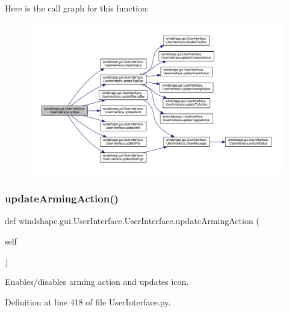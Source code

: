 Here is the call graph for this function\+:\nopagebreak
\begin{figure}[H]
\begin{center}
\leavevmode
\includegraphics[width=350pt]{classwindshape_1_1gui_1_1_user_interface_1_1_user_interface_a65ae15262d2becb2093acd7e54b92fb3_cgraph}
\end{center}
\end{figure}
\mbox{\label{classwindshape_1_1gui_1_1_user_interface_1_1_user_interface_a6eea698663fbc82963d3984b0a9a8ef1}} 
\subsubsection{\texorpdfstring{update\+Arming\+Action()}{updateArmingAction()}}
{\footnotesize\ttfamily def windshape.\+gui.\+User\+Interface.\+User\+Interface.\+update\+Arming\+Action (\begin{DoxyParamCaption}\item[{}]{self }\end{DoxyParamCaption})}

\begin{DoxyVerb}Enables/disables arming action and updates icon.\end{DoxyVerb}
 

Definition at line 418 of file User\+Interface.\+py.


